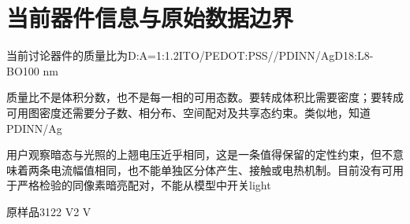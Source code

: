 \section{{\cjkfont 当前器件信息与原始数据边界}\allowbreak{}}\label{sec:8}
{\cjkfont 当前讨论器件的质量比为}\allowbreak{}D:A=\allowbreak{}1:1.2\allowbreak{}ITO/PEDOT:PSS/\allowbreak{}/PDINN/Ag\allowbreak{}D18:L8-BO\allowbreak{}100 nm\allowbreak{}
\par
{\cjkfont 质量比不是体积分数，也不是每一相的可用态数。要转成体积比需要密度；要转成可用图密度还需要分子数、相分布、空间配对及共享态约束。类似地，知道}\allowbreak{}PDINN/Ag\allowbreak{}
\par
{\cjkfont 用户观察暗态与光照的上翘电压近乎相同，这是一条值得保留的定性约束，但不意味着两条电流幅值相同，也不能单独区分体产生、接触或电热机制。目前没有可用于严格检验的同像素暗亮配对，不能从模型中开关}\allowbreak{}light\allowbreak{}
\par
{\cjkfont 原样品}\allowbreak{}3\allowbreak{}1\allowbreak{}2\allowbreak{}2 V\allowbreak{}2 V\allowbreak{}
\par
